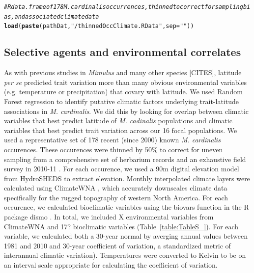 \documentclass[11pt, oneside]{article}\usepackage[]{graphicx}\usepackage[]{color}
\makeatletter
\newcommand{\hlstr}[1]{\textcolor[rgb]{0.192,0.494,0.8}{#1}}%
\newcommand{\hlcom}[1]{\textcolor[rgb]{0.678,0.584,0.686}{\textit{#1}}}%
\newcommand{\hlstd}[1]{\textcolor[rgb]{0.345,0.345,0.345}{#1}}%
\newcommand{\hlkwc}[1]{\textcolor[rgb]{0.333,0.667,0.333}{#1}}%
\newcommand{\hlkwd}[1]{\textcolor[rgb]{0.737,0.353,0.396}{\textbf{#1}}}%
\newenvironment{kframe}{%
 \def\at@end@of@kframe{}%
 \ifinner\ifhmode%
  \def\at@end@of@kframe{\end{minipage}}%
  \begin{minipage}{\columnwidth}%
 \fi\fi%
 \def\FrameCommand##1{\hskip\@totalleftmargin \hskip-\fboxsep
 \colorbox{shadecolor}{##1}\hskip-\fboxsep
     \hskip-\linewidth \hskip-\@totalleftmargin \hskip\columnwidth}%
 \MakeFramed {\advance\hsize-\width
   \@totalleftmargin\z@ \linewidth\hsize
   \@setminipage}}%
 {\par\unskip\endMakeFramed%
 \at@end@of@kframe}
\newenvironment{knitrout}{}{} %
\newcommand{\pkg}[1]{{\fontseries{b}\selectfont #1}}
\makeatother
\begin{document}
\begin{knitrout}
\color{fgcolor}\begin{kframe}
\begin{alltt}
\hlcom{# R data.frame of 178 M. cardinalis occurrences, thinned to correct for sampling bias, and associated climate data}
\hlkwd{load}\hlstd{(}\hlkwd{paste}\hlstd{(pathDat,} \hlstr{"/thinnedOccClimate.RData"}\hlstd{,} \hlkwc{sep} \hlstd{=} \hlstr{""}\hlstd{))}
\end{alltt}
\end{kframe}
\end{knitrout}

\subsection*{Selective agents and environmental correlates}

As with previous studies in \textit{Mimulus} and many other species [CITES], latitude \textit{per se} predicted trait variation more than many obvious environmental variables (e.g. temperature or precipitation) that covary with latitude. We used Random Forest regression \citep{Liaw_Wiener_2002} to identify putative climatic factors underlying trait-latitude associations in \textit{M. cardinalis}. We did this by looking for overlap between climatic variables that best predict latitude of \textit{M. cadinalis} populations and climatic variables that best predict trait variation across our 16 focal populations. We used a representative set of 178 recent (since 2000) known \textit{M. cardinalis} occurences. These occurences were thinned by 50\% to correct for uneven sampling from a comprehensive set of herbarium records and an exhaustive field survey in 2010-11 \citep{Angert_ENM}. For each occurence, we used a 90m digital elevation model from HydroSHEDS \citep{Lehner_etal_2006} to extract elevation. Monthly interpolated climate layers were calculated using ClimateWNA \citep{Wang_etal_2012}, which accurately downscales climate data specifically for the rugged topography of western North America. For each occurence, we calculated bioclimatic variables using the biovars function in the R package \pkg{dismo} \citep{Hijmans_etal_2014}. In total, we included X environmental variables from ClimateWNA and 17? bioclimatic variables (Table~\ref{table:TableS_}). For each variable, we calculated both a 30-year normal by averging annual values between 1981 and 2010 and 30-year coefficient of variation, a standardized metric of interannual climatic variation). Temperatures were converted to Kelvin to be on an interval scale appropriate for calculating the coefficient of variation. 
\end{document}
